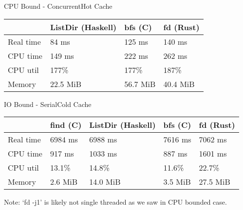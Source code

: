 \documentclass[17pt]{beamer}
\begin{document}
%

\begin{frame}{CPU Bound - Concurrent}{Hot Cache}
\footnotesize

\begin{tabular}{|l|l|l|l|}
\hline
  & ListDir (Haskell) & bfs (C) & fd (Rust) \\
\hline
  Real time & 84 ms & 125 ms & 140 ms \\
\hline
  CPU time & 149 ms & 222 ms & 262 ms \\
\hline
  CPU util & 177\% & 177\% & 187\% \\
\hline
  Memory & 22.5 MiB & 56.7 MiB & 40.4 MiB \\
\hline
\end{tabular}
\end{frame}

\begin{frame}{IO Bound - Serial}{Cold Cache}
\footnotesize

\begin{tabular}{|l|l|l|l|l|}
\hline
  & find (C)
  & ListDir (Haskell)
  & bfs (C)
  & fd (Rust)
  \\
\hline
  Real time
  & 6984 ms
  & 6988 ms
  & 7616 ms
  & 7062 ms
  \\
\hline
  CPU time
  & 917 ms
  & 1033 ms
  & 887 ms
  & 1601 ms
  \\
\hline
  CPU util
  & 13.1\%
  & 14.8\%
  & 11.6\%
  & 22.7\%
  \\
\hline
  Memory
  & 2.6 MiB
  & 14.0 MiB
  & 3.5 MiB
  & 27.5 MiB
  \\
\hline
\end{tabular}

Note: `fd -j1' is likely not single threaded as we saw in CPU bounded case.

\end{frame}
\end{document}
